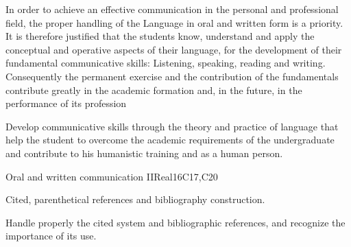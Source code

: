 \begin{syllabus}


\begin{justification}
In order to achieve an effective communication in the personal and professional field, the proper handling of the Language in oral and written form is a priority. It is therefore justified that the students know, understand and apply the conceptual and operative aspects of their language, for the development of their fundamental communicative skills: Listening, speaking, reading and writing.
Consequently the permanent exercise and the contribution of the fundamentals contribute greatly in the academic formation and, in the future, in the performance of its profession
\end{justification}

\begin{goals}
\item Develop communicative skills through the theory and practice of language that help the student to overcome the academic requirements of the undergraduate and contribute to his humanistic training and as a human person.
\end{goals}

\begin{outcomes}
   \item {}
   \item {}
   \item {}
\end{outcomes}

\begin{competences}
    \item {}
    \item {}
    \item {}
\end{competences}

\begin{unit}{Oral and written communication II}{}{Real}{16}{C17,C20}
\begin{topics}
      \item Cited, parenthetical references and bibliography construction.
\end{topics}

\begin{learningoutcomes}
   \item Handle properly the cited system and bibliographic references, and recognize the importance of its use.
\end{learningoutcomes}
\end{unit}



\begin{coursebibliography}
\end{coursebibliography}

\end{syllabus}
